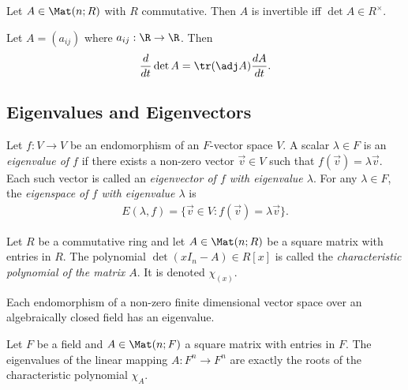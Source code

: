 \documentclass{article}
\begin{document}
\begin{corollary}[Notes 4.4.11]
	Let $A\in\Mat(n;R)$ with $R$ commutative. Then $A$ is invertible iff $\det A\in R^\times$.
\end{corollary}

\begin{theorem}
	Let $A=(a_{ij})$ where $a_{ij}:\R\to\R$. Then
	\begin{align*}
		\frac{d}{dt}\det A = \tr(\adj A)\frac{dA}{dt}.
	\end{align*}
\end{theorem}

\subsection{Eigenvalues and Eigenvectors}

\begin{definition}
	Let $f:V\to V$ be an endomorphism of an $F$-vector space $V$. A scalar $\lambda\in F$ is
	an \emph{eigenvalue of $f$} if there exists a non-zero vector $\vec v \in V$ such that
	$f(\vec v)=\lambda \vec v$. Each such vector is called an \emph{eigenvector of $f$ with
		eigenvalue $\lambda$}. For any $\lambda\in F$, the \emph{eigenspace of $f$ with eigenvalue $\lambda$}
	is
	\begin{align*}
		E(\lambda,f) = \{\vec v\in V:f(\vec v)=\lambda\vec v\}.
	\end{align*}
\end{definition}

\begin{definition}
	Let $R$ be a commutative ring and let $A\in\Mat(n; R)$ be a square matrix with entries in $R$.
	The polynomial $\det(xI_n-A)\in R[x]$ is called the \emph{characteristic polynomial of the matrix
		$A$}. It is denoted $\chi_(x)$.
\end{definition}

\begin{theorem}[Notes 4.5.4]
	Each endomorphism of a non-zero finite dimensional vector space over an algebraically closed field
	has an eigenvalue.
\end{theorem}

\begin{theorem}[Notes 4.5.8]
	Let $F$ be a field and $A\in\Mat(n;F)$ a square matrix with entries in $F$. The eigenvalues of the
	linear mapping $A:F^n\to F^n$ are exactly the roots of the characteristic polynomial $\chi_A$.
\end{theorem}
\end{document}

